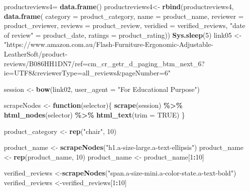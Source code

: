 \documentclass[
]{article}
\newenvironment{Shaded}{\begin{snugshade}}{\end{snugshade}}
\newcommand{\AttributeTok}[1]{\textcolor[rgb]{0.13,0.29,0.53}{#1}}
\newcommand{\ConstantTok}[1]{\textcolor[rgb]{0.56,0.35,0.01}{#1}}
\newcommand{\ControlFlowTok}[1]{\textcolor[rgb]{0.13,0.29,0.53}{\textbf{#1}}}
\newcommand{\DecValTok}[1]{\textcolor[rgb]{0.00,0.00,0.81}{#1}}
\newcommand{\FunctionTok}[1]{\textcolor[rgb]{0.13,0.29,0.53}{\textbf{#1}}}
\newcommand{\NormalTok}[1]{#1}
\newcommand{\OtherTok}[1]{\textcolor[rgb]{0.56,0.35,0.01}{#1}}
\newcommand{\SpecialCharTok}[1]{\textcolor[rgb]{0.81,0.36,0.00}{\textbf{#1}}}
\newcommand{\StringTok}[1]{\textcolor[rgb]{0.31,0.60,0.02}{#1}}
\begin{document}
\begin{Shaded}
\begin{Highlighting}[]
\NormalTok{  productreviews4}\OtherTok{=} \FunctionTok{data.frame}\NormalTok{()}
\NormalTok{  productreviews4}\OtherTok{\textless{}{-}} \FunctionTok{rbind}\NormalTok{(productreviews4, }\FunctionTok{data.frame}\NormalTok{(}
                      \AttributeTok{category =}\NormalTok{ product\_category,}
                      \AttributeTok{name =}\NormalTok{ product\_name,}
                      \AttributeTok{reviewer =}\NormalTok{ product\_reviewer,}
                      \AttributeTok{reviews =}\NormalTok{ product\_review,}
                      \AttributeTok{veridied =}\NormalTok{ verified\_reviews,}
                      \StringTok{"date of review"} \OtherTok{=}\NormalTok{ product\_date,}
                      \AttributeTok{ratings =}\NormalTok{ product\_rating))}
  \FunctionTok{Sys.sleep}\NormalTok{(}\DecValTok{5}\NormalTok{)}
\NormalTok{link05 }\OtherTok{\textless{}{-}} \StringTok{"https://www.amazon.com.au/Flash{-}Furniture{-}Ergonomic{-}Adjustable{-}LeatherSoft/product{-}reviews/B086HH1DN7/ref=cm\_cr\_getr\_d\_paging\_btm\_next\_6?ie=UTF8\&reviewerType=all\_reviews\&pageNumber=6"}


\NormalTok{  session }\OtherTok{\textless{}{-}} \FunctionTok{bow}\NormalTok{(link02,}
               \AttributeTok{user\_agent =} \StringTok{"For Educational Purpose"}\NormalTok{)}

\NormalTok{  scrapeNodes }\OtherTok{\textless{}{-}} \ControlFlowTok{function}\NormalTok{(selector)\{}
    \FunctionTok{scrape}\NormalTok{(session) }\SpecialCharTok{\%\textgreater{}\%}
      \FunctionTok{html\_nodes}\NormalTok{(selector) }\SpecialCharTok{\%\textgreater{}\%}
      \FunctionTok{html\_text}\NormalTok{(}\AttributeTok{trim =} \ConstantTok{TRUE}\NormalTok{)}
\NormalTok{  \}}

\NormalTok{  product\_category }\OtherTok{\textless{}{-}} \FunctionTok{rep}\NormalTok{(}\StringTok{"chair"}\NormalTok{, }\DecValTok{10}\NormalTok{)}

\NormalTok{  product\_name }\OtherTok{\textless{}{-}} \FunctionTok{scrapeNodes}\NormalTok{(}\StringTok{"h1.a{-}size{-}large.a{-}text{-}ellipsis"}\NormalTok{)}
\NormalTok{  product\_name }\OtherTok{\textless{}{-}} \FunctionTok{rep}\NormalTok{(product\_name, }\DecValTok{10}\NormalTok{)}
\NormalTok{  product\_name }\OtherTok{\textless{}{-}}\NormalTok{ product\_name[}\DecValTok{1}\SpecialCharTok{:}\DecValTok{10}\NormalTok{]}
  
\NormalTok{  verified\_reviews }\OtherTok{\textless{}{-}}\FunctionTok{scrapeNodes}\NormalTok{(}\StringTok{"span.a{-}size{-}mini.a{-}color{-}state.a{-}text{-}bold"}\NormalTok{)}
\NormalTok{  verified\_reviews }\OtherTok{\textless{}{-}}\NormalTok{verified\_reviews[}\DecValTok{1}\SpecialCharTok{:}\DecValTok{10}\NormalTok{]}
  

\end{Highlighting}
\end{Shaded}
\end{document}
